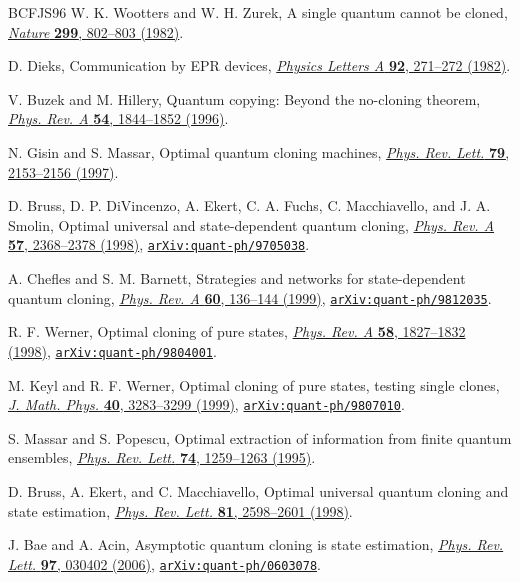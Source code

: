 \documentclass[11pt]{article}
\theoremstyle{remark}
\theoremstyle{plain}
\newcommand{\doi}[2]{\href{https://doi.org/#1}{#2}}
\newcommand{\arxiv}[1]{\href{https://arxiv.org/abs/#1}{\texttt{arXiv:#1}}}
\begin{document}
\begin{thebibliography}{BCFJS96}
W. K. Wootters and W. H. Zurek,
A single quantum cannot be cloned,
\doi{10.1038/299802a0}{\emph{Nature} \textbf{299}, 802--803 (1982)}.

D. Dieks,
Communication by EPR devices,
\doi{10.1016/0375-9601(82)90084-6}{\emph{Physics Letters A} \textbf{92}, 271--272 (1982)}.

V. Buzek and M. Hillery,
Quantum copying: Beyond the no-cloning theorem,
\doi{10.1103/PhysRevA.54.1844}{\emph{Phys. Rev. A} \textbf{54}, 1844--1852 (1996)}.

N. Gisin and S. Massar,
Optimal quantum cloning machines,
\doi{10.1103/PhysRevLett.79.2153}{\emph{Phys. Rev. Lett.} \textbf{79}, 2153--2156 (1997)}.

D. Bruss, D. P. DiVincenzo, A. Ekert, C. A. Fuchs, C. Macchiavello, and J. A. Smolin,
Optimal universal and state-dependent quantum cloning,
\doi{10.1103/PhysRevA.57.2368}{\emph{Phys. Rev. A} \textbf{57}, 2368--2378 (1998)},
\arxiv{quant-ph/9705038}.

A. Chefles and S. M. Barnett,
Strategies and networks for state-dependent quantum cloning,
\doi{10.1103/PhysRevA.60.136}{\emph{Phys. Rev. A} \textbf{60}, 136--144 (1999)},
\arxiv{quant-ph/9812035}.

R. F. Werner,
Optimal cloning of pure states,
\doi{10.1103/PhysRevA.58.1827}{\emph{Phys. Rev. A} \textbf{58}, 1827--1832 (1998)},
\arxiv{quant-ph/9804001}.

M. Keyl and R. F. Werner,
Optimal cloning of pure states, testing single clones,
\doi{10.1063/1.532887}{\emph{J. Math. Phys.} \textbf{40}, 3283--3299 (1999)},
\arxiv{quant-ph/9807010}.

S. Massar and S. Popescu,
Optimal extraction of information from finite quantum ensembles,
\doi{10.1103/PhysRevLett.74.1259}{\emph{Phys. Rev. Lett.} \textbf{74}, 1259--1263 (1995)}.

D. Bruss, A. Ekert, and C. Macchiavello,
Optimal universal quantum cloning and state estimation,
\doi{10.1103/PhysRevLett.81.2598}{\emph{Phys. Rev. Lett.} \textbf{81}, 2598--2601 (1998)}.

J. Bae and A. Acin,
Asymptotic quantum cloning is state estimation,
\doi{10.1103/PhysRevLett.97.030402}{\emph{Phys. Rev. Lett.} \textbf{97}, 030402 (2006)},
\arxiv{quant-ph/0603078}.


\end{thebibliography}
\end{document}
